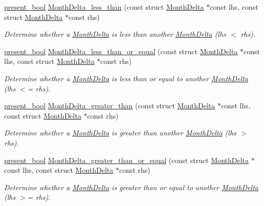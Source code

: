 \begin{DoxyCompactItemize}
\hyperlink{types_8h_a1c24e2cdd988b886e889080ded176ae0}{present\-\_\-bool} \hyperlink{month-delta_8h_af10d7aa9aad3ecb5d10f2091fa4fb5c4}{\-Month\-Delta\-\_\-less\-\_\-than} (const struct \hyperlink{structMonthDelta}{\-Month\-Delta} $\ast$const lhs, const struct \hyperlink{structMonthDelta}{\-Month\-Delta} $\ast$const rhs)
\begin{DoxyCompactList}\small\item\em \-Determine whether a \hyperlink{structMonthDelta}{\-Month\-Delta} is less than another \hyperlink{structMonthDelta}{\-Month\-Delta} (lhs $<$ rhs). \end{DoxyCompactList}\item 
\hyperlink{types_8h_a1c24e2cdd988b886e889080ded176ae0}{present\-\_\-bool} \hyperlink{month-delta_8h_a6f360c9e40307f6643c309ccc66fb5a5}{\-Month\-Delta\-\_\-less\-\_\-than\-\_\-or\-\_\-equal} (const struct \hyperlink{structMonthDelta}{\-Month\-Delta} $\ast$const lhs, const struct \hyperlink{structMonthDelta}{\-Month\-Delta} $\ast$const rhs)
\begin{DoxyCompactList}\small\item\em \-Determine whether a \hyperlink{structMonthDelta}{\-Month\-Delta} is less than or equal to another \hyperlink{structMonthDelta}{\-Month\-Delta} (lhs $<$= rhs). \end{DoxyCompactList}\item 
\hyperlink{types_8h_a1c24e2cdd988b886e889080ded176ae0}{present\-\_\-bool} \hyperlink{month-delta_8h_a8bdc5fd7fb7fb5168163046902ff219b}{\-Month\-Delta\-\_\-greater\-\_\-than} (const struct \hyperlink{structMonthDelta}{\-Month\-Delta} $\ast$const lhs, const struct \hyperlink{structMonthDelta}{\-Month\-Delta} $\ast$const rhs)
\begin{DoxyCompactList}\small\item\em \-Determine whether a \hyperlink{structMonthDelta}{\-Month\-Delta} is greater than another \hyperlink{structMonthDelta}{\-Month\-Delta} (lhs $>$ rhs). \end{DoxyCompactList}\item 
\hyperlink{types_8h_a1c24e2cdd988b886e889080ded176ae0}{present\-\_\-bool} \hyperlink{month-delta_8h_ad31b71629077ae015d463e9f9193f767}{\-Month\-Delta\-\_\-greater\-\_\-than\-\_\-or\-\_\-equal} (const struct \hyperlink{structMonthDelta}{\-Month\-Delta} $\ast$const lhs, const struct \hyperlink{structMonthDelta}{\-Month\-Delta} $\ast$const rhs)
\begin{DoxyCompactList}\small\item\em \-Determine whether a \hyperlink{structMonthDelta}{\-Month\-Delta} is greater than or equal to another \hyperlink{structMonthDelta}{\-Month\-Delta} (lhs $>$= rhs). \end{DoxyCompactList}\end{DoxyCompactItemize}


